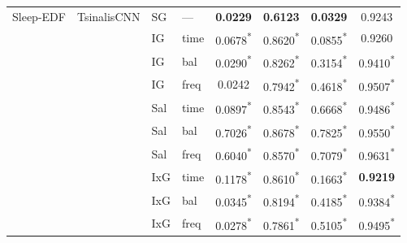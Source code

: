 \begin{landscape}
\begin{table}[p]
\begin{tabular}{@{}llllcccc@{}}
\midrule
Sleep-EDF & TsinalisCNN & SG & --- & \textbf{0.0229} & \textbf{0.6123} & \textbf{0.0329} & 0.9243 \\
 &  & IG & time & 0.0678\textsuperscript{*} & 0.8620\textsuperscript{*} & 0.0855\textsuperscript{*} & 0.9260 \\
 &  & IG & bal & 0.0290\textsuperscript{*} & 0.8262\textsuperscript{*} & 0.3154\textsuperscript{*} & 0.9410\textsuperscript{*} \\
 &  & IG & freq & 0.0242 & 0.7942\textsuperscript{*} & 0.4618\textsuperscript{*} & 0.9507\textsuperscript{*} \\
 &  & Sal & time & 0.0897\textsuperscript{*} & 0.8543\textsuperscript{*} & 0.6668\textsuperscript{*} & 0.9486\textsuperscript{*} \\
 &  & Sal & bal & 0.7026\textsuperscript{*} & 0.8678\textsuperscript{*} & 0.7825\textsuperscript{*} & 0.9550\textsuperscript{*} \\
 &  & Sal & freq & 0.6040\textsuperscript{*} & 0.8570\textsuperscript{*} & 0.7079\textsuperscript{*} & 0.9631\textsuperscript{*} \\
 &  & IxG & time & 0.1178\textsuperscript{*} & 0.8610\textsuperscript{*} & 0.1663\textsuperscript{*} & \textbf{0.9219} \\
 &  & IxG & bal & 0.0345\textsuperscript{*} & 0.8194\textsuperscript{*} & 0.4185\textsuperscript{*} & 0.9384\textsuperscript{*} \\
 &  & IxG & freq & 0.0278\textsuperscript{*} & 0.7861\textsuperscript{*} & 0.5105\textsuperscript{*} & 0.9495\textsuperscript{*} \\
\bottomrule
\end{tabular}
\end{table}
\end{landscape}
